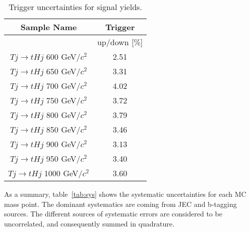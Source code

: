 \begin{table*}[htbH]
\begin{center}
\begin{tabular}{|c|c|}
\hline 
Sample Name & Trigger \\
\hline
 & up/down [\%] \\
\hline
$Tj\rightarrow tHj$ 600 GeV/$c^{2}$ & 2.51 \\
$Tj\rightarrow tHj$ 650 GeV/$c^{2}$ & 3.31 \\
$Tj\rightarrow tHj$ 700 GeV/$c^{2}$ & 4.02 \\
$Tj\rightarrow tHj$ 750 GeV/$c^{2}$ & 3.72 \\
$Tj\rightarrow tHj$ 800 GeV/$c^{2}$ & 3.79 \\
$Tj\rightarrow tHj$ 850 GeV/$c^{2}$ & 3.46 \\
$Tj\rightarrow tHj$ 900 GeV/$c^{2}$ & 3.13 \\
$Tj\rightarrow tHj$ 950 GeV/$c^{2}$ & 3.40 \\
$Tj\rightarrow tHj$ 1000 GeV/$c^{2}$ & 3.60 \\
\hline
\end{tabular}
\caption{Trigger uncertainties for signal yields.\label{tab:Trisys}}
\end{center}
\end{table*}

As a summary, table~\ref{tab:sys} shows the systematic uncertainties for each MC mass point. The dominant systematics are coming from JEC and b-tagging sources. The different sources of systematic errors are considered to be uncorrelated, and consequently summed in quadrature. %

